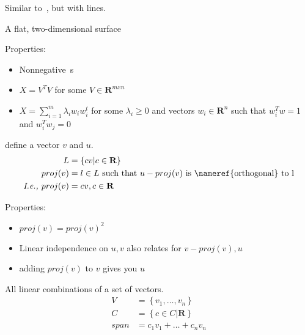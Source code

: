 \begin{definition}[Perpendicular]
    Similar to~, but with lines.
\end{definition}

\begin{definition}[Plane]
    A flat, two-dimensional surface
\end{definition}

\begin{definition}
    Properties:
    \begin{itemize}
        \item Nonnegative~s
        \item $X = V^{T}V$ for some $V \in \mathbf{R}^{mxn}$
        \item $X = \sum\limits_{i=1}^{m}\lambda_{i}w_{i}w^{t}_{i}$ 
            for some $\lambda_{i} \geq 0$ and vectors $w_{i} \in \mathbf{R}^{n}$
            such that $w^{T}_{i}w = 1$ and $w^{T}_{i}w_{j} = 0$

    \end{itemize}
\end{definition}

\begin{definition}[Projection]
    define a vector $v$ and $u$.
    \begin{align*}
        L &= \left\{cv | c \in \mathbf{R} \right\}  \\
        proj(v) &= l \in L \text{\ such that\ } u - proj(v) 
        \text{\ is~\nameref{orthogonal} to l}  \\
        \textit{I.e., } proj(v) &= cv, c \in \mathbf{R}
    \end{align*}

    Properties:
    \begin{itemize}
        \item $proj(v) = proj(v)^{2}$
        \item Linear independence on $u, v$ also relates for $v - proj(v), u$
        \item adding $proj(v)$ to $v$ gives you $u$
    \end{itemize}

\end{definition}

\begin{definition}\label{vectorspan}
    All linear combinations of a set of vectors.
    \begin{align*}
        V &= \left\{v_{1}, \dots, v_n\right\} \\
        C &= \left\{c \in C | \mathbf{R}\right\} \\
        span &= c_{1}v_{1} + \dots + c_{n}v_{n}
    \end{align*}
\end{definition}

